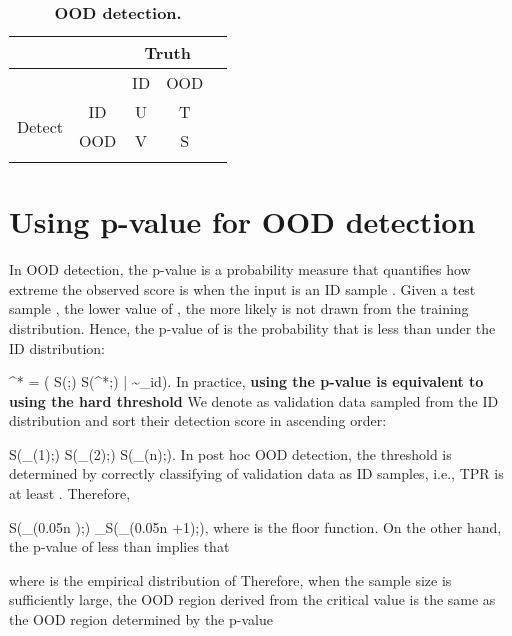 \documentclass{article} \usepackage{iclr2023_conference,times}
\def\rvx{{\mathbf{x}}}
\def\gD{{\mathcal{D}}}
\def\sP{{\mathbb{P}}}
\newcommand{\benrr}{}
\begin{document}
\begin{table}[t]
\caption{{\bf OOD detection.}}
\label{tableA10}
\begin{center}
\begin{tabular}{cc|cc|c}
\hline\hline
 & & \multicolumn{2}{c|}{Truth} &   \\
\hline
 & & ID & OOD & \\
\hline
\multirow{2}{*}{Detect}  
 & ID & U & T & \\
  & OOD & V & S &  \\
\hline
  &  &  &  &  \\
\hline\hline
\end{tabular}
\end{center}
\end{table}






\section{Using p-value for OOD detection}\label{App:C}


In OOD detection, the p-value is a probability measure that quantifies how extreme the observed score is when the input is an ID sample \citep{cai2020real,morningstar2021density,haroush2021statistical,bergamin2022model,magesh2022multiple,kaur2022idecode}.
Given a test sample , the lower value of , the more likely  is not drawn from the training distribution. Hence, the p-value of  is the probability that  is less than   under the ID distribution: 
\benrr
{} \rvx^* = \sP\big( S(\rvx;\phi) \leq S(\rvx^*;\phi) \big| \rvx\sim \gD_{id}\big).
\eenrr
In practice, {\bf using the p-value is equivalent to using the hard threshold}  
We denote  as validation data sampled from the ID distribution  and sort their detection score in ascending order:
\benrr
S(\rvx_{(1)};\phi) \leq S(\rvx_{(2)};\phi) \leq \cdots \leq S(\rvx_{(n)};\phi).
\eenrr
In post hoc OOD detection, the threshold  is determined by correctly classifying  of validation data as ID samples, i.e., TPR is at least . Therefore,
\benrr
S(\rvx_{(\lfloor 0.05n \rfloor)};\phi) \leq \lambda_\phi \leq S(\rvx_{(\lfloor 0.05n \rfloor+1)};\phi),
\eenrr
where  is the floor function. 
On the other hand, the p-value of  less than  implies that 

where  is the empirical distribution of  
Therefore, when the sample size  is sufficiently large, the OOD region derived from the critical value  is the same as the OOD region determined by the p-value 
\end{document}
